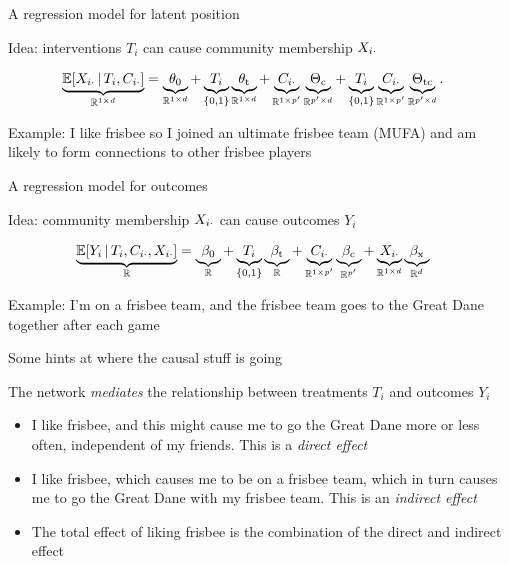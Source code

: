 \documentclass{beamer}
\theoremstyle{remark}
\begin{document}
\begin{frame}{A regression model for latent position}

    Idea: interventions $T_i$ can cause community membership $X_{i \cdot}$

    \begin{align*}
        \underbrace{\E[T_i, \C_{i \cdot}]{\X_{i \cdot}}}_{\R^{1 \times d}}
         & = \underbrace{\thetazero}_{\R^{1 \times d}}
        + \underbrace{T_i}_{\{0, 1\}} \underbrace{\thetat}_{\R^{1 \times d}}
        + \underbrace{\C_{i \cdot}}_{\R^{1 \times p'}} \underbrace{\Thetac}_{\R^{p' \times d}}
        + \underbrace{T_i}_{\{0, 1\}} \underbrace{\C_{i \cdot}}_{\R^{1 \times p'}} \underbrace{\Thetatc}_{\R^{p' \times d}}.
    \end{align*}

    Example: I like frisbee so I joined an ultimate frisbee team (MUFA) and am likely to form connections to other frisbee players

\end{frame}

\begin{frame}{A regression model for outcomes}

    Idea: community membership $X_{i \cdot}$ can cause outcomes $Y_i$

    \begin{align*}
        \underbrace{\E[T_i, \C_{i \cdot}, \X_{i \cdot}]{Y_i}}_{\R}
         & = \underbrace{\betazero}_{\R}
        + \underbrace{T_i}_{\{0, 1\}} \underbrace{\betat}_{\R}
        + \underbrace{\C_{i \cdot}}_{\R^{1 \times p'}} \underbrace{\betac}_{\R^{p'}}
        + \underbrace{\X_{i \cdot}}_{\R^{1 \times d}} \underbrace{\betax}_{\R^d}
    \end{align*}

    Example: I'm on a frisbee team, and the frisbee team goes to the Great Dane together after each game

\end{frame}

\begin{frame}{Some hints at where the causal stuff is going}

    The network \emph{mediates} the relationship between treatments $T_i$ and outcomes $Y_i$

    \begin{itemize}
        \item I like frisbee, and this might cause me to go the Great Dane more or less often, independent of my friends. This is a \emph{direct effect}
        \item I like frisbee, which causes me to be on a frisbee team, which in turn causes me to go the Great Dane with my frisbee team. This is an \emph{indirect effect}
        \item The total effect of liking frisbee is the combination of the direct and indirect effect
    \end{itemize}

\end{frame}
\end{document}
